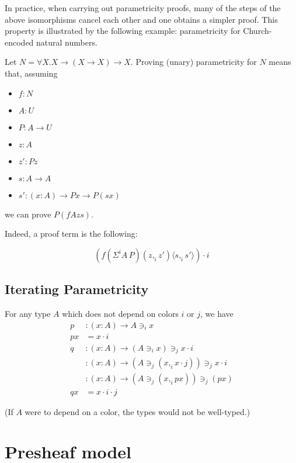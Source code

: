 \documentclass[english]{PaperTools/latex/lipics}
\newcommand\CP[3]{(#2,_{#1} #3)}
\newcommand\param[1]{\!\cdot\!#1}
\newcommand\op[1]{∋_{#1}}
\newcommand\ip[3]{Σ^{#1} {#2}\,{#3}}
\newcommand\fp[3]{⟨#2 ,_{#1} #3⟩}
\begin{document}
In practice, when carrying out parametricity proofs, many of the steps
of the above isomorphisms cancel each other and one obtains a simpler
proof. This property is illustrated by the following example:
parametricity for Church-encoded natural numbers.
\begin{example}
Let $N = ∀X. X → (X → X) → X$.
Proving (unary) parametricity for $N$ means that, assuming
\begin{itemize}
\item $f : N$
\item $A : U$
\item $P : A → U$
\item $z : A$
\item $z' : P z$
\item $s : A → A$
\item $s' : (x:A) → P x → P (s x)$
\end{itemize}
we can prove $P (f A z s)$.

Indeed, a proof term is the following:

\[
(f (\ip i A P) \CP i z {z'} \fp i s {s'}) \param i
\]
\end{example}

\subsection{Iterating Parametricity}
For any type $A$ which does not depend on colors $i$ or $j$, we have
\begin{align*}
p &: (x:A) → A \op i x\\
p x &= x\param i\\
q &: (x:A) → (A \op i x) \op j x \param  i\\
  &: (x:A) → (A \op j \CP i x {x \param j}) \op j x \param  i\\
  &: (x:A) → (A \op j \CP i x {p x}) \op j (p x)\\
q x &= x\param i\param j
\end{align*}

(If $A$ were to depend on a color, the types would not be well-typed.)

\section{Presheaf model}
\end{document}
